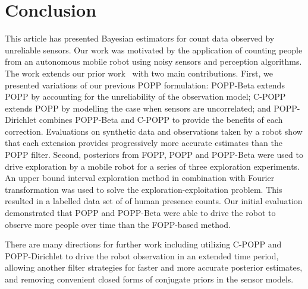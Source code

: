 
\section{Conclusion}
\label{sec:conclusion}

This article has presented Bayesian estimators for count data observed by unreliable sensors. Our work was motivated by the application of counting people from an autonomous mobile robot using noisy sensors and perception algorithms. The work extends our prior work~\cite{jovan18a} with two main contributions.
% 
First, we presented variations of our previous POPP formulation: POPP-Beta extends POPP by accounting for the unreliability of the observation model; C-POPP extends POPP  by modelling the case when sensors are uncorrelated; and POPP-Dirichlet combines POPP-Beta and C-POPP to provide the benefits of each correction. Evaluations on synthetic data and observations taken by a robot show that each extension provides progressively more accurate estimates than the POPP filter.  
% 
Second, posteriors from FOPP, POPP and POPP-Beta were used to drive exploration by a mobile robot for a series of three exploration experiments. An upper bound interval exploration method in combination with Fourier transformation was used to solve the exploration-exploitation problem. This resulted in a labelled data set of of human presence counts. Our initial evaluation demonstrated that POPP and POPP-Beta were able to drive the robot to observe more people over time than the FOPP-based method. 

There are many directions for further work including utilizing C-POPP and POPP-Dirichlet to drive the robot observation in an extended time period, allowing another filter strategies for faster and more accurate posterior estimates, and removing convenient closed forms of conjugate priors in the sensor models.
        

